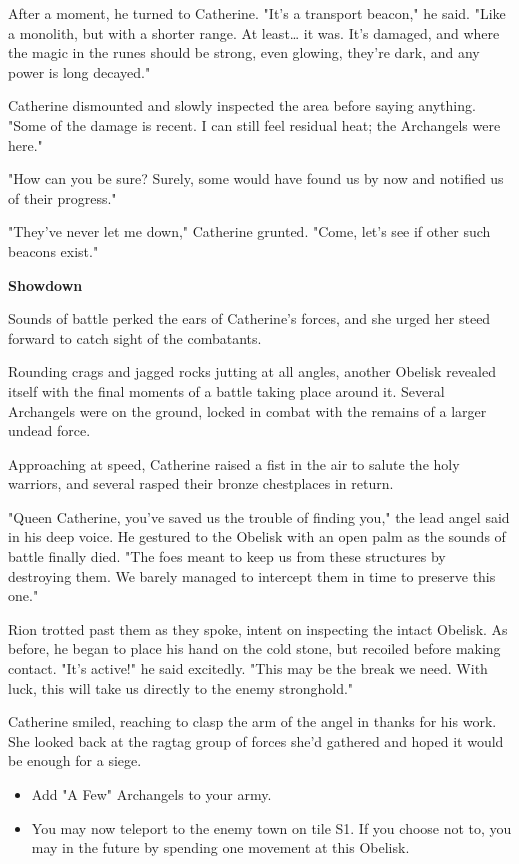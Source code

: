 \begin{multicols*}{2}
After a moment, he turned to Catherine. "It's a transport beacon," he said. "Like a monolith, but with a shorter range. At least… it was. It's damaged, and where the magic in the runes should be strong, even glowing, they're dark, and any power is long decayed."

Catherine dismounted and slowly inspected the area before saying anything. "Some of the damage is recent. I can still feel residual heat; the Archangels were here."

"How can you be sure? Surely, some would have found us by now and notified us of their progress."

"They've never let me down," Catherine grunted. "Come, let's see if other such beacons exist."

\textbf{Showdown}

Sounds of battle perked the ears of Catherine's forces, and she urged her steed forward to catch sight of the combatants.

Rounding crags and jagged rocks jutting at all angles, another Obelisk revealed itself with the final moments of a battle taking place around it. Several Archangels were on the ground, locked in combat with the remains of a larger undead force.

Approaching at speed, Catherine raised a fist in the air to salute the holy warriors, and several rasped their bronze chestplaces in return.

"Queen Catherine, you've saved us the trouble of finding you," the lead angel said in his deep voice. He gestured to the Obelisk with an open palm as the sounds of battle finally died. "The foes meant to keep us from these structures by destroying them. We barely managed to intercept them in time to preserve this one."

Rion trotted past them as they spoke, intent on inspecting the intact Obelisk. As before, he began to place his hand on the cold stone, but recoiled before making contact. "It's active!" he said excitedly. "This may be the break we need. With luck, this will take us directly to the enemy stronghold."

Catherine smiled, reaching to clasp the arm of the angel in thanks for his work. She looked back at the ragtag group of forces she'd gathered and hoped it would be enough for a siege.

\begin{itemize}
  \item \textcolor{darkcandyapplered}{Add "A Few" Archangels to your army.}
  \item \textcolor{darkcandyapplered}{You may now teleport to the enemy town on tile S1. If you choose not to, you may in the future by spending one movement at this Obelisk.}
\end{itemize}



\end{multicols*}
